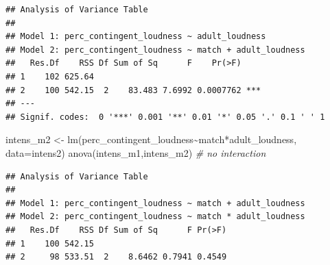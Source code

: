 \documentclass[
]{article}
\newenvironment{Shaded}{\begin{snugshade}}{\end{snugshade}}
\newcommand{\AttributeTok}[1]{\textcolor[rgb]{0.77,0.63,0.00}{#1}}
\newcommand{\CommentTok}[1]{\textcolor[rgb]{0.56,0.35,0.01}{\textit{#1}}}
\newcommand{\DecValTok}[1]{\textcolor[rgb]{0.00,0.00,0.81}{#1}}
\newcommand{\FunctionTok}[1]{\textcolor[rgb]{0.00,0.00,0.00}{#1}}
\newcommand{\NormalTok}[1]{#1}
\newcommand{\OtherTok}[1]{\textcolor[rgb]{0.56,0.35,0.01}{#1}}
\newcommand{\SpecialCharTok}[1]{\textcolor[rgb]{0.00,0.00,0.00}{#1}}
\newcommand{\StringTok}[1]{\textcolor[rgb]{0.31,0.60,0.02}{#1}}
\begin{document}
\begin{verbatim}
## Analysis of Variance Table
## 
## Model 1: perc_contingent_loudness ~ adult_loudness
## Model 2: perc_contingent_loudness ~ match + adult_loudness
##   Res.Df    RSS Df Sum of Sq      F    Pr(>F)    
## 1    102 625.64                                  
## 2    100 542.15  2    83.483 7.6992 0.0007762 ***
## ---
## Signif. codes:  0 '***' 0.001 '**' 0.01 '*' 0.05 '.' 0.1 ' ' 1
\end{verbatim}

\begin{Shaded}
\begin{Highlighting}[]
\NormalTok{intens\_m2 }\OtherTok{\textless{}{-}} \FunctionTok{lm}\NormalTok{(perc\_contingent\_loudness}\SpecialCharTok{\textasciitilde{}}\NormalTok{match}\SpecialCharTok{*}\NormalTok{adult\_loudness, }\AttributeTok{data=}\NormalTok{intens2)}
\FunctionTok{anova}\NormalTok{(intens\_m1,intens\_m2) }\CommentTok{\# no interaction}
\end{Highlighting}
\end{Shaded}

\begin{verbatim}
## Analysis of Variance Table
## 
## Model 1: perc_contingent_loudness ~ match + adult_loudness
## Model 2: perc_contingent_loudness ~ match * adult_loudness
##   Res.Df    RSS Df Sum of Sq      F Pr(>F)
## 1    100 542.15                           
## 2     98 533.51  2    8.6462 0.7941 0.4549
\end{verbatim}

\begin{Shaded}
\end{Shaded}
\end{document}
